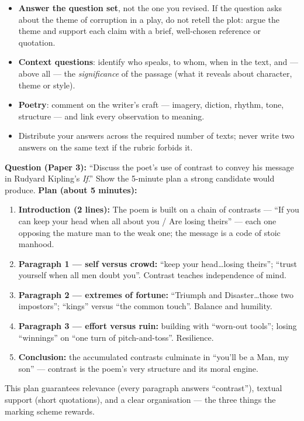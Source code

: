 \documentclass[11pt]{article}
\begin{document}
\begin{itemize}
\item \textbf{Answer the question set}, not the one you revised. If the question asks about the theme of corruption in a play, do not retell the plot: argue the theme and support each claim with a brief, well-chosen reference or quotation.
\item \textbf{Context questions}: identify who speaks, to whom, when in the text, and --- above all --- the \emph{significance} of the passage (what it reveals about character, theme or style).
\item \textbf{Poetry}: comment on the writer's craft --- imagery, diction, rhythm, tone, structure --- and link every observation to meaning.
\item Distribute your answers across the required number of texts; never write two answers on the same text if the rubric forbids it.
\end{itemize}

\begin{exoresolu}
\textbf{Question (Paper 3):} ``Discuss the poet's use of contrast to convey his message in Rudyard Kipling's \emph{If}.'' Show the 5-minute plan a strong candidate would produce.
\tcblower
\textbf{Plan (about 5 minutes):}
\begin{enumerate}
\item \textbf{Introduction (2 lines):} The poem is built on a chain of contrasts --- ``If you can keep your head when all about you / Are losing theirs'' --- each one opposing the mature man to the weak one; the message is a code of stoic manhood.
\item \textbf{Paragraph 1 --- self versus crowd:} ``keep your head\ldots losing theirs''; ``trust yourself when all men doubt you''. Contrast teaches independence of mind.
\item \textbf{Paragraph 2 --- extremes of fortune:} ``Triumph and Disaster\ldots those two impostors''; ``kings'' versus ``the common touch''. Balance and humility.
\item \textbf{Paragraph 3 --- effort versus ruin:} building with ``worn-out tools''; losing ``winnings'' on ``one turn of pitch-and-toss''. Resilience.
\item \textbf{Conclusion:} the accumulated contrasts culminate in ``you'll be a Man, my son'' --- contrast is the poem's very structure and its moral engine.
\end{enumerate}
This plan guarantees relevance (every paragraph answers ``contrast''), textual support (short quotations), and a clear organisation --- the three things the marking scheme rewards.
\end{exoresolu}
\end{document}

